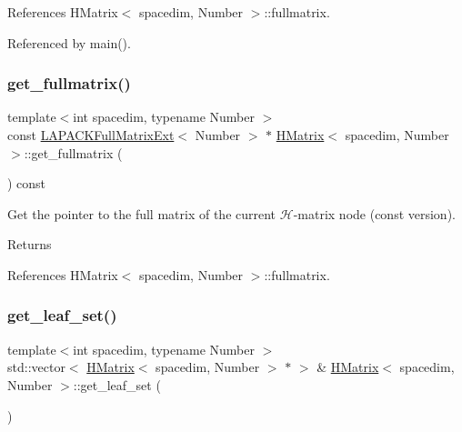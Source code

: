 References H\+Matrix$<$ spacedim, Number $>$\+::fullmatrix.



Referenced by main().

\mbox{\label{classHMatrix_aed550b5b41a64c6f1bbcde4f8f7eca91}} 
\subsubsection{\texorpdfstring{get\+\_\+fullmatrix()}{get\_fullmatrix()}\hspace{0.1cm}{\footnotesize\ttfamily [2/2]}}
{\footnotesize\ttfamily template$<$int spacedim, typename Number $>$ \\
const \hyperlink{classLAPACKFullMatrixExt}{L\+A\+P\+A\+C\+K\+Full\+Matrix\+Ext}$<$ Number $>$ $\ast$ \hyperlink{classHMatrix}{H\+Matrix}$<$ spacedim, Number $>$\+::get\+\_\+fullmatrix (\begin{DoxyParamCaption}{ }\end{DoxyParamCaption}) const}

Get the pointer to the full matrix of the current $\mathcal{H}$-\/matrix node (const version). \begin{DoxyReturn}{Returns}

\end{DoxyReturn}


References H\+Matrix$<$ spacedim, Number $>$\+::fullmatrix.

\mbox{\label{classHMatrix_ac5c9102fc04997c1ae3627185379d9bb}} 
\subsubsection{\texorpdfstring{get\+\_\+leaf\+\_\+set()}{get\_leaf\_set()}\hspace{0.1cm}{\footnotesize\ttfamily [1/2]}}
{\footnotesize\ttfamily template$<$int spacedim, typename Number $>$ \\
std\+::vector$<$ \hyperlink{classHMatrix}{H\+Matrix}$<$ spacedim, Number $>$ $\ast$ $>$ \& \hyperlink{classHMatrix}{H\+Matrix}$<$ spacedim, Number $>$\+::get\+\_\+leaf\+\_\+set (\begin{DoxyParamCaption}{ }\end{DoxyParamCaption})}

